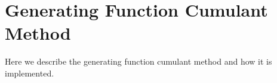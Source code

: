 \section{Generating Function Cumulant Method}
\label{GFC}
Here we describe the generating function cumulant method and how it is implemented.
